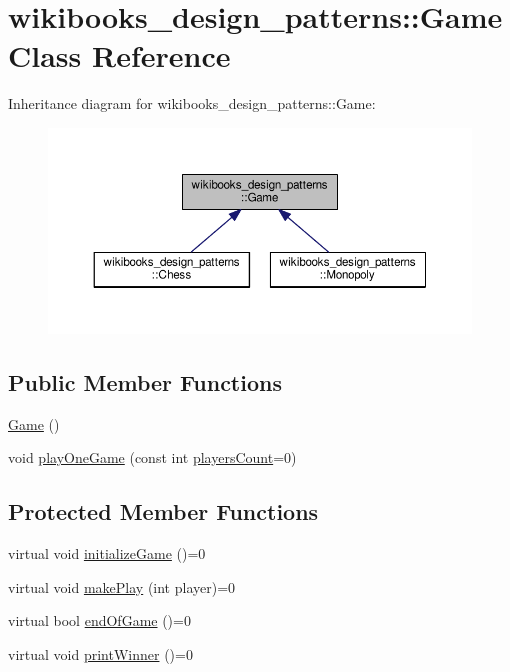 \hypertarget{classwikibooks__design__patterns_1_1Game}{}\section{wikibooks\+\_\+design\+\_\+patterns\+:\+:Game Class Reference}
\label{classwikibooks__design__patterns_1_1Game}


Inheritance diagram for wikibooks\+\_\+design\+\_\+patterns\+:\+:Game\+:
\nopagebreak
\begin{figure}[H]
\begin{center}
\leavevmode
\includegraphics[width=350pt]{classwikibooks__design__patterns_1_1Game__inherit__graph}
\end{center}
\end{figure}
\subsection*{Public Member Functions}
\begin{DoxyCompactItemize}
\item 
\hyperlink{classwikibooks__design__patterns_1_1Game_acdfcc4d37f30a39ed438b81de8e00046}{Game} ()
\item 
void \hyperlink{classwikibooks__design__patterns_1_1Game_adaf21d3c4d07388f1cba12092ced5d38}{play\+One\+Game} (const int \hyperlink{classwikibooks__design__patterns_1_1Game_a8641adb02e0f068ff9ecb6c375562d7b}{players\+Count}=0)
\end{DoxyCompactItemize}
\subsection*{Protected Member Functions}
\begin{DoxyCompactItemize}
\item 
virtual void \hyperlink{classwikibooks__design__patterns_1_1Game_a77c50ee852af77bb15d46ba0a39683c4}{initialize\+Game} ()=0
\item 
virtual void \hyperlink{classwikibooks__design__patterns_1_1Game_ab1859f681536780d02da57634e963d4a}{make\+Play} (int player)=0
\item 
virtual bool \hyperlink{classwikibooks__design__patterns_1_1Game_a351f5fb200c6b26d5b6150f1f09bc87d}{end\+Of\+Game} ()=0
\item 
virtual void \hyperlink{classwikibooks__design__patterns_1_1Game_a98d860c143cb793b4c1cb630d9314cba}{print\+Winner} ()=0
\end{DoxyCompactItemize}

